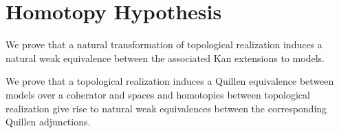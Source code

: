 \section{Homotopy Hypothesis} \label{sec: homotopy hypothesis}

We prove that a natural transformation of topological realization induces a natural weak equivalence between the associated Kan extensions to models.

We prove that a topological realization induces a Quillen equivalence between models over a coherator and spaces and homotopies between topological realization give rise to natural weak equivalences between the corresponding Quillen adjunctions.


